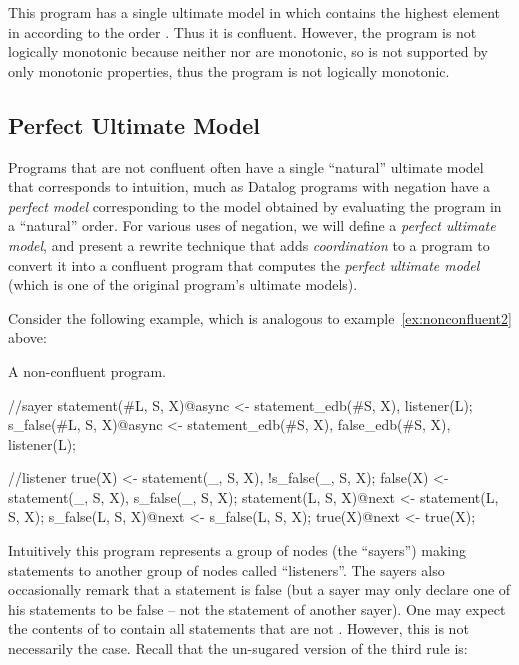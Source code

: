 
This program has a single ultimate model in which  contains the highest
element in  according to the order \dedalus{<}.
Thus it is confluent.  However, the program is not logically monotonic because neither  nor  are monotonic, so  is not supported by only monotonic properties, thus the program is not logically monotonic.

\subsection{Perfect Ultimate Model}
Programs that are not confluent often have a single ``natural'' ultimate model that corresponds to intuition, much as Datalog programs with negation have a {\em perfect model} corresponding to the model obtained by evaluating the program in a ``natural'' order.  For various uses of negation, we will define a {\em perfect ultimate model}, and present a rewrite technique that adds {\em coordination} to a \lang program to convert it into a confluent \lang program that computes the {\em perfect ultimate model} (which is one of the original program's ultimate models).

Consider the following example, which is analogous to example~\ref{ex:nonconfluent2} above:

\begin{example}
\label{ex:sayers}
A non-confluent \lang program.

\begin{Dedalus}
//sayer
statement(#L, S, X)@async <- statement_edb(#S, X),
                             listener(L);
s_false(#L, S, X)@async <- statement_edb(#S, X),
                           false_edb(#S, X),
                           listener(L);

//listener
true(X) <- statement(_, S, X), !s_false(_, S, X);
false(X) <- statement(_, S, X), s_false(_, S, X);
statement(L, S, X)@next <- statement(L, S, X);
s_false(L, S, X)@next <- s_false(L, S, X);
true(X)@next <- true(X);
\end{Dedalus}
\end{example}

Intuitively this program represents a group of nodes (the ``sayers'') making statements to another group of nodes called ``listeners''.  The sayers also occasionally remark that a statement is false (but a sayer may only declare one of his statements to be false -- not the statement of another sayer).  One may expect the contents of  to contain all statements that are not .  However, this is not necessarily the case.  Recall that the un-sugared version of the third rule is:


